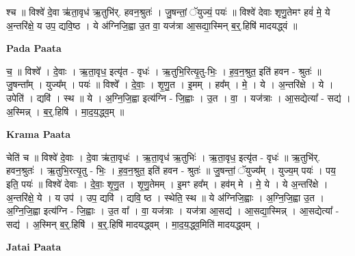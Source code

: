 \documentclass[17pt]{extarticle}
\begin{document}
श्च ॥ विश्वे॑ दे॒वा ऋ॑ता॒वृध॑ ऋ॒तुभि॑र्. हवन॒श्रुतः॑ । जु॒षन्तां॒ ॅयुज्यं॒ पयः॑ ॥ विश्वे॑ देवाः शृणु॒तेमꣳ हवं॑ मे॒ ये अ॒न्तरि॑क्षे॒ य उप॒ द्यवि॒ष्ठ । ये अ॑ग्निजि॒ह्वा उ॒त वा॒ यज॑त्रा आ॒सद्या॒स्मिन् ब॒र्॒.हिषि॑ मादयद्ध्वं ॥ \newline

\textbf{Pada Paata} \newline

च॒ ॥ विश्वे᳚ । दे॒वाः । ऋ॒ता॒वृध॒ इत्यृ॑त - वृधः॑ । ऋ॒तुभि॒रित्यृ॒तु-भिः॒ । ह॒व॒न॒श्रुत॒ इति॑ हवन - श्रुतः॑ ॥ जु॒षन्ता᳚म् । युज्य᳚म् ।    पयः॑ ॥ विश्वे᳚ । दे॒वाः॒ । शृ॒णु॒त । इ॒मम् । हव᳚म् । मे॒ । ये । अ॒न्तरि॑क्षे । ये । उपेति॑ । द्यवि॑ । स्थ ॥ ये । अ॒ग्नि॒जि॒ह्वा इत्य॑ग्नि - जि॒ह्वाः । उ॒त । वा॒ । यज॑त्राः । आ॒सद्येत्या᳚ - सद्य॑ । अ॒स्मिन्न् । ब॒र्॒.हिषि॑ । मा॒द॒य॒द्ध्व॒म् ॥  \newline


\textbf{Krama Paata} \newline

चेति॑ च ॥ विश्वे॑ दे॒वाः । दे॒वा ऋ॑ता॒वृधः॑ । ऋ॒ता॒वृध॑ ऋ॒तुभिः॑ । ऋ॒ता॒वृध॒ इत्यृ॑त - वृधः॑ ॥ ऋ॒तुभि॑र्. हवन॒श्रुतः॑ । ऋ॒तुभि॒रत्यृ॒तु - भिः॒ । ह॒व॒न॒श्रुत॒ इति॑ हवन - श्रुतः॑ ॥ जु॒षन्तां॒ ॅयुज्य᳚म् । युज्य॒म् पयः॑ । पय॒ इति॒ पयः॑ ॥ विश्वे॑ देवाः । दे॒वाः॒ शृ॒णु॒त । शृ॒णु॒तेमम् । इ॒मꣳ हव᳚म् । हव॑म् मे । मे॒ ये । ये अ॒न्तरि॑क्षे । अ॒न्तरि॑क्षे॒ ये । य उप॑ । उप॒ द्यवि॑ । द्यवि॒ ष्ठ । स्थेति॒ स्थ ॥ ये अ॑ग्निजि॒ह्वाः । अ॒ग्नि॒जि॒ह्वा उ॒त । अ॒ग्नि॒जि॒ह्वा इत्य॑ग्नि - जि॒ह्वाः । उ॒त वा᳚ । वा॒ यज॑त्राः । यज॑त्रा आ॒सद्य॑ । आ॒सद्या॒स्मिन्न् । आ॒सद्येत्या᳚ - सद्य॑ । अ॒स्मिन् ब॒र्॒.हिषि॑ । ब॒र्॒.हिषि॑ मादयद्ध्वम् । मा॒द॒य॒द्ध्व॒मिति॑ मादयद्ध्वम् । \newline

\textbf{Jatai Paata} \newline
\end{document}
